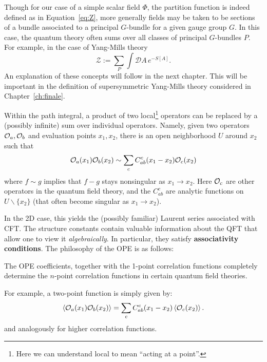 		
		\begin{remark}
			Though for our case of a simple scalar field $\Phi$, the partition function is indeed defined as in Equation~\eqref{eq:Z}, more generally fields may be taken to be sections of a bundle associated to a principal $G$-bundle for a given gauge group $G$. In this case, the quantum theory often sums over all classes of principal $G$-bundles $P$. For example, in the case of Yang-Mills theory
			\begin{equation}
				\mathcal Z := \sum_{P} \int \mathcal DA \, e^{- S[A]}.
			\end{equation}
			An explanation of these concepts will follow in the next chapter. This will be important in the definition of supersymmetric Yang-Mills theory considered in Chapter~\ref{ch:finale}.
		\end{remark}
		

		\begin{phys}
			 Within the path integral, a product of two local\footnote{Here we can understand local to mean ``acting at a point''.} operators can be replaced by a (possibly infinite) sum over individual operators. Namely, given two operators $\mathcal{O}_a, \mathcal{O}_b$ and evaluation points $x_1, x_2$, there is an open neighborhood $U$ around $x_2$ such that
			\begin{equation}
				\mathcal{O}_a (x_1) \mathcal{O}_b(x_2) \sim \sum_c C_{ab}^c(x_1-x_2) \mathcal{O}_c(x_2)
			\end{equation}
			where $f \sim g$ implies that $f - g$ stays nonsingular as $x_1 \to x_2$.
		Here $\mathcal{O}_c$ are other operators in the quantum field theory, and the $C_{ab}^c$ are analytic functions on $U \backslash \{ x_2 \}$ (that often become singular as $x_1 \to x_2$). 
		\end{phys}
	
		In the 2D case, this yields the (possibly familiar) Laurent series associated with CFT. The structure constants contain valuable information about the QFT that allow one to view it \emph{algebraically}. In particular, they satisfy \textbf{associativity conditions}. The philosophy of the OPE is as follows: %
		\begin{idea}
			The OPE coefficients, together with the 1-point correlation functions completely determine the $n$-point correlation functions in certain quantum field theories. 
		\end{idea}
	\noindent 	For example, a two-point function is simply given by:
		\begin{equation}
			\left< \mathcal{O}_a(x_1) \mathcal{O}_b(x_2) \right> = \sum_c C^c_{ab}(x_1 - x_2) \left< \mathcal O_c (x_2) \right>.
		\end{equation}
		and analogously for higher correlation functions. 
	
